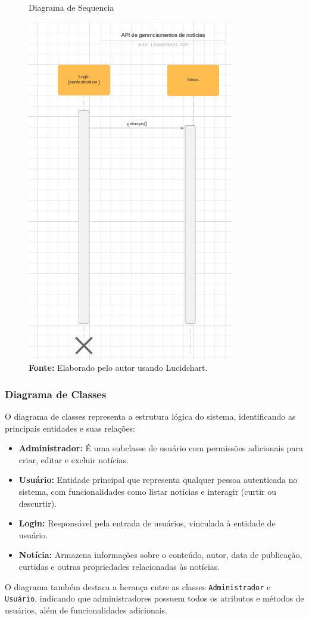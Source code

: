 \begin{figure} [H]
    \centering
    \caption{Diagrama de Sequencia}
    \includegraphics[width=0.5\linewidth]{imagens/sequencia diagrama.jpeg}
    \caption*{\textbf{Fonte:} Elaborado pelo autor usando Lucidchart.}
    \label{fig:enter-label}
\end{figure}

\subsubsection{Diagrama de Classes}

O diagrama de classes representa a estrutura lógica do sistema, identificando as principais entidades e suas relações:
\begin{itemize}
    \item \textbf{Administrador:} É uma subclasse de usuário com permissões adicionais para criar, editar e excluir notícias.
    \item \textbf{Usuário:} Entidade principal que representa qualquer pessoa autenticada no sistema, com funcionalidades como listar notícias e interagir (curtir ou descurtir).
    \item \textbf{Login:} Responsável pela entrada de usuários, vinculada à entidade de usuário.
    \item \textbf{Notícia:} Armazena informações sobre o conteúdo, autor, data de publicação, curtidas e outras propriedades relacionadas às notícias.
\end{itemize}
O diagrama também destaca a herança entre as classes \texttt{Administrador} e \texttt{Usuário}, indicando que administradores possuem todos os atributos e métodos de usuários, além de funcionalidades adicionais.


